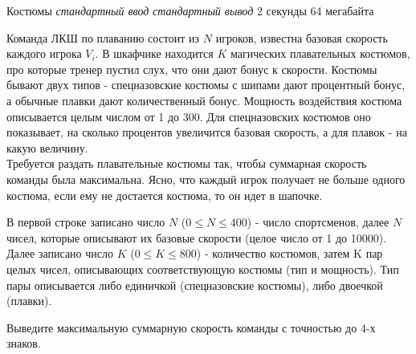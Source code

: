 \begin{problem}%
{Костюмы}%
{\textsl{стандартный ввод}}%
{\textsl{стандартный вывод}}%
{2 секунды}%
{64 мегабайта}{}

Команда ЛКШ по плаванию состоит из $N$ игроков, известна базовая скорость каждого игрока $V_i$. В шкафчике находится $K$ магических плавательных костюмов, про которые тренер пустил слух, что они дают бонус к скорости. Костюмы бывают двух типов - спецназовские костюмы с шипами дают процентный бонус, а обычные плавки дают количественный бонус. Мощность воздействия костюма описывается целым числом от 1 до 300. Для спецназовских костюмов оно показывает, на сколько процентов увеличится базовая скорость, а для плавок - на какую величину.\\

Требуется раздать плавательные костюмы так, чтобы суммарная скорость команды была максимальна. Ясно, что каждый игрок получает не больше одного костюма, если ему не достается костюма, то он идет в шапочке.

\InputFile

В первой строке записано число $N$ ($0 \le N \le 400$) - число спортсменов, далее $N$ чисел, которые описывают их базовые скорости (целое число от 1 до 10000). Далее записано число $K$ ($0 \le K \le 800$) - количество костюмов, затем K пар целых чисел, описывающих соответствующую костюмы (тип и мощность). Тип пары описывается либо единичкой (спецназовские костюмы), либо двоечкой (плавки).

\OutputFile

Выведите максимальную суммарную скорость команды с точностью до 4-х знаков.

\Examples

\begin{example}
%
\end{example}
\end{problem}